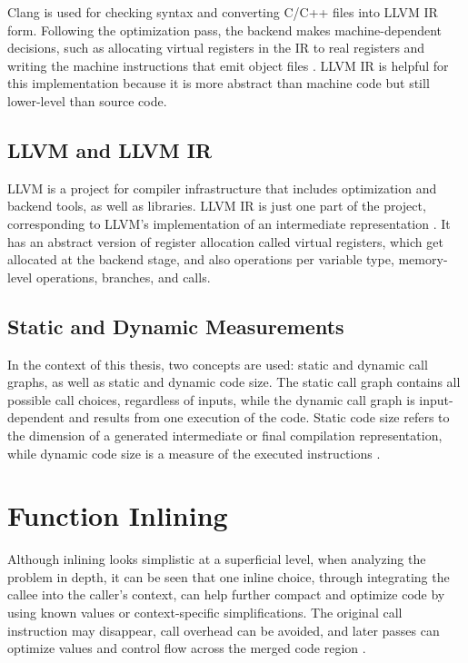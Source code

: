 \documentclass[12pt, a4paper]{report}
\begin{document}
Clang is used for checking syntax and converting C/C++ files into LLVM IR form.
Following the optimization pass, the backend makes machine-dependent decisions,
such as allocating virtual registers in the IR to real registers and writing the
machine instructions that emit object files
\cite{cooper2011engineering,muchnick1997advanced}. LLVM IR is helpful for this
implementation because it is more abstract than machine code but still
lower-level than source code.

\section{LLVM and LLVM IR}

LLVM is a project for compiler infrastructure that includes optimization and
backend tools, as well as libraries. LLVM IR is just one part of the project,
corresponding to LLVM's implementation of an intermediate representation
\cite{llvmlangref,llvmpasses}. It has an abstract version of register allocation
called virtual registers, which get allocated at the backend stage, and also
operations per variable type, memory-level operations, branches, and calls.

\section{Static and Dynamic Measurements}

In the context of this thesis, two concepts are used: static and dynamic call
graphs, as well as static and dynamic code size. The static call graph contains
all possible call choices, regardless of inputs, while the dynamic call graph is
input-dependent and results from one execution of the code. Static code size
refers to the dimension of a generated intermediate or final compilation
representation, while dynamic code size is a measure of the executed
instructions
\cite{cooper2011engineering,godbolt2019optimizations}.


\chapter{Function Inlining}

Although inlining looks simplistic at a superficial level, when analyzing the
problem in depth, it can be seen that one inline choice, through integrating
the callee into the caller's context, can help further compact and optimize
code by using known values or context-specific simplifications. The original
call instruction may disappear, call overhead can be avoided, and later passes
can optimize values and control flow across the merged code region
\cite{cooper2011engineering,muchnick1997advanced,godbolt2019optimizations}.
\end{document}

